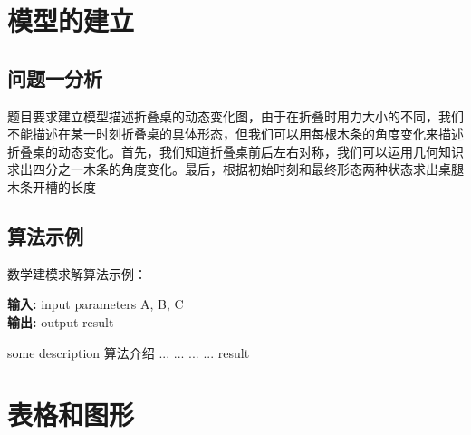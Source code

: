 \documentclass[bwprint]{gmcmthesis}
\begin{document}


\section{模型的建立}

\subsection{问题一分析}
题目要求建立模型描述折叠桌的动态变化图，由于在折叠时用力大小的不同，我们不能描述在某一时刻折叠桌的具体形态，但我们可以用每根木条的角度变化来描述折叠桌的动态变化。首先，我们知道折叠桌前后左右对称，我们可以运用几何知识求出四分之一木条的角度变化。最后，根据初始时刻和最终形态两种状态求出桌腿木条开槽的长度


\subsection{算法示例}

数学建模求解算法示例：
\begin{center}
\begin{minipage}{0.8\textwidth}
\begin{algorithm}[H]%
\caption{算法的名字} %
{\bf 输入:} %
input parameters A, B, C\\
{\bf 输出:} %
output result
\begin{algorithmic}[1]
\State some description 算法介绍 %
  \State ...
    \State ...
  \Else
    \State ...
  \EndIf
\EndFor
{} %
  \State ...
\EndWhile
\State \Return result
\end{algorithmic}
\end{algorithm}
\end{minipage}
\end{center}
\vspace{2ex}

\section{表格和图形}
\end{document}
